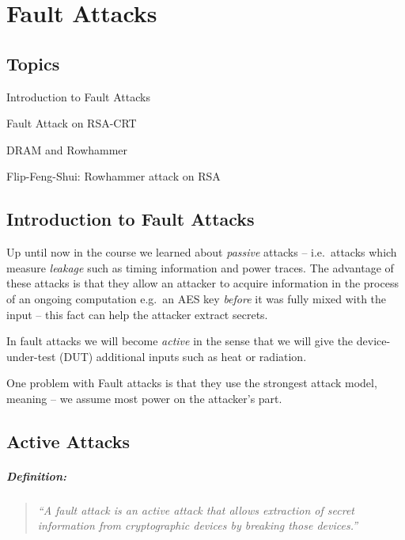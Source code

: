 \newcommand{\Mod}[1]{\ (\mathrm{mod}\ #1)}
\chapter{Fault Attacks}\label{cha:c9_ninthchapter}

\begin{centering}
	\section*{Topics}\label{sec:topics}
		\begin{enumerate}
		\end{enumerate}
\end{centering}
\newpage

\section*{Introduction to Fault Attacks}\label{sec:introduction_to_fault_attacks}
Up until now in the course we learned about \emph{passive} attacks -- i.e.\
attacks which measure \emph{leakage} such as timing information and power
traces. The advantage of these attacks is that they allow an attacker to acquire
information in the process of an ongoing computation e.g.\ an AES key
\emph{before} it was fully mixed with the input -- this fact can help the
attacker extract secrets.

In fault attacks we will become \emph{active} in the sense that we will give the
device-under-test (DUT) additional inputs such as heat or radiation.

One problem with Fault attacks is that they use the strongest attack model, meaning --
we assume most power on the attacker's part.

\section{Active Attacks}\label{sec:active_attacks}
\paragraph{Definition:}
\begin{quote}
	\textit{``A fault attack is an active attack that allows extraction of secret information from cryptographic devices by breaking those devices.''}
\end{quote}

